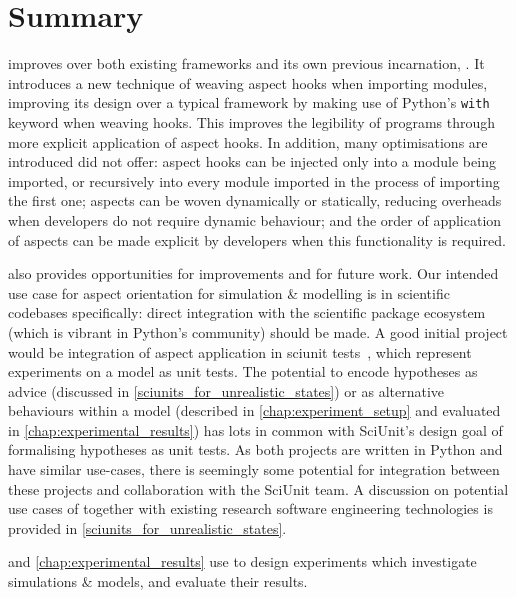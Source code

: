 \section{Summary}
\label{pdsf3_discussion}

\pdsfthree{} improves over both existing \aop{} frameworks and its own previous
incarnation, \pydysofu{}. It introduces a new technique of weaving aspect hooks
when importing modules, improving its design over a typical \aspectorientation{}
framework by making use of Python's \lstinline{with} keyword when weaving hooks.
This improves the legibility of \aspectoriented{} programs through more explicit
application of aspect hooks. In addition, many optimisations are introduced
\pydysofu did not offer: aspect hooks can be injected only into a module being
imported, or recursively into every module imported in the process of importing
the first one; aspects can be woven dynamically or statically, reducing
overheads when developers do not require dynamic behaviour; and the order of
application of aspects can be made explicit by developers when this
functionality is required.

\pdsfthree{} also provides opportunities for improvements and
for future work. Our intended use case for aspect orientation for simulation \&
modelling is in scientific codebases specifically: direct integration with the
scientific package ecosystem (which is vibrant in Python's community) should be
made. A good initial project would be integration of aspect application in
sciunit tests~\cite{sciunit_primer}, which represent experiments on a model as
unit tests. The potential to encode hypotheses as advice (discussed in
\cref{sciunits_for_unrealistic_states}) or as alternative behaviours within a
model (described in \cref{chap:experiment_setup} and evaluated in
\cref{chap:experimental_results}) has lots in common with SciUnit's design goal
of formalising hypotheses as unit tests. As both projects are written in Python
and have similar use-cases, there is seemingly some potential for integration
between these projects and collaboration with the SciUnit team. A discussion on
potential use cases of \pdsfthree together with existing research software
engineering technologies is provided in \cref{sciunits_for_unrealistic_states}.

 and \cref{chap:experimental_results} use \pdsfthree
to design experiments which investigate \aspectoriented{} simulations \& models,
and evaluate their results.
